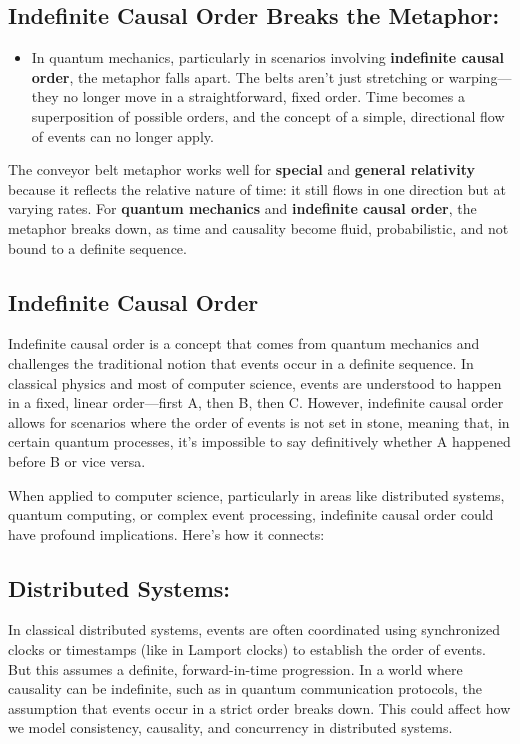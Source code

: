 \subsection*{Indefinite Causal Order Breaks the Metaphor:}

\begin{itemize}[leftmargin=1.5em]
\item In quantum mechanics, particularly in scenarios involving \textbf{indefinite causal order}, the metaphor falls apart. The belts aren’t just stretching or warping—they no longer move in a straightforward, fixed order. Time becomes a superposition of possible orders, and the concept of a simple, directional flow of events can no longer apply.
\end{itemize}

The conveyor belt metaphor works well for \textbf{special} and \textbf{general relativity} because it reflects the relative nature of time: it still flows in one direction but at varying rates. For \textbf{quantum mechanics} and \textbf{indefinite causal order}, the metaphor breaks down, as time and causality become fluid, probabilistic, and not bound to a definite sequence.

\subsection{Indefinite Causal Order}

Indefinite causal order is a concept that comes from quantum mechanics and challenges the traditional notion that events occur in a definite sequence. In classical physics and most of computer science, events are understood to happen in a fixed, linear order—first A, then B, then C. However, indefinite causal order allows for scenarios where the order of events is not set in stone, meaning that, in certain quantum processes, it’s impossible to say definitively whether A happened before B or vice versa.

When applied to computer science, particularly in areas like distributed systems, quantum computing, or complex event processing, indefinite causal order could have profound implications. Here's how it connects:

\subsection*{Distributed Systems:}

In classical distributed systems, events are often coordinated using synchronized clocks or timestamps (like in Lamport clocks) to establish the order of events. But this assumes a definite, forward-in-time progression. In a world where causality can be indefinite, such as in quantum communication protocols, the assumption that events occur in a strict order breaks down. This could affect how we model consistency, causality, and concurrency in distributed systems.

